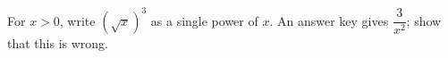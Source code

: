 For $x>0$, write $\left(\sqrt x\right)^3$ as a single power of $x$. An answer key gives $\dfrac{3}{x^2}$; show that this is wrong.
